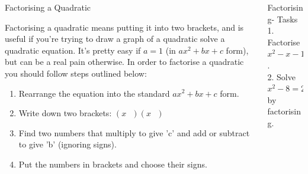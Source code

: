 \documentclass[final]{beamer}
\newlength{\onecolwid}
\newlength{\twocolwid}
\begin{document}
\begin{frame}[t]
\begin{columns}[t]
\begin{column}{\twocolwid}
\begin{columns}[t,totalwidth=\twocolwid]
\begin{column}{\onecolwid}\vspace{-.6in} %


\begin{block}{Factorising a Quadratic}

Factorising a quadratic means putting it into two brackets, and is useful if you're trying to draw a graph of a quadratic solve a quadratic equation. It's pretty easy if $a=1$ (in $ax^2+bx+c$ form), but can be a real pain otherwise.
\newline
\newline
In order to factorise a quadratic you should follow steps outlined below:

\begin{enumerate}
\item Rearrange the equation into the standard $ax^2+bx+c$ form.
\item Write down two brackets: $(x\ \ \ )(x\ \ \ )$
\item Find two numbers that multiply to give 'c' and add or subtract to give 'b' (ignoring signs).
\item Put the numbers in brackets and choose their signs.
\end{enumerate}

\end{block}


\end{column} %

\begin{column}{\onecolwid}\vspace{-.6in} %


\begin{block}{Factorising- Tasks}
1. Factorise $x^2-x-12$.
\[\]
\[\]
\[\]
\[\]
2. Solve $x^2-8=2x$ by factorising.

\end{block}


\end{column}
\end{columns}
\end{column}
\end{columns}
\end{frame}
\end{document}
